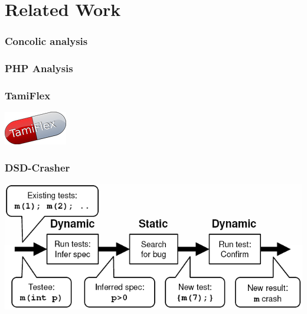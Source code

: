 \documentclass{beamer}
\begin{document}
\section{Related Work}

\begin{frame}
  \frametitle{Concolic analysis}
\end{frame}

\begin{frame}
  \frametitle{PHP Analysis}
\end{frame}

\begin{frame}
  \frametitle{TamiFlex}

\begin{center}
\includegraphics[width=\textwidth]{images/tamiflex.png}
\end{center}
\end{frame}

\begin{frame}
  \frametitle{DSD-Crasher}

\begin{center}
\includegraphics[width=\textwidth]{images/dsd.png}
\end{center}
\end{frame}
\end{document}
